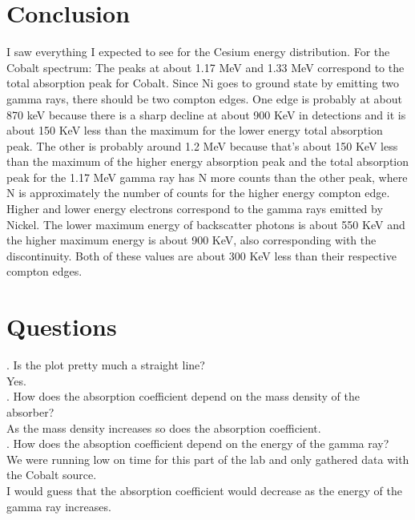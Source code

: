\documentclass[12pt]{article}
\begin{document}
\section{Conclusion}
\indent \indent I saw everything I expected to see for the Cesium energy distribution. For the Cobalt spectrum: The peaks at about 1.17 MeV and 1.33 MeV correspond to the total absorption peak for Cobalt. Since Ni goes to ground state by emitting two gamma rays, there should be two compton edges. One edge is probably at about 870 keV because there is a sharp decline at about 900 KeV in detections and it is about 150 KeV less than the maximum for the lower energy total absorption peak. The other is probably around 1.2 MeV because that's about 150 KeV less than the maximum of the higher energy absorption peak and the total absorption peak for the 1.17 MeV gamma ray has N more counts than the other peak, where N is approximately the number of counts for the higher energy compton edge. Higher and lower energy electrons correspond to the gamma rays emitted by Nickel. The lower maximum energy of backscatter photons is about 550 KeV and the higher maximum energy is about 900 KeV, also corresponding with the discontinuity. Both of these values are about 300 KeV less than their respective compton edges.

\section{Questions}
\indent {}. Is the plot pretty much a straight line? \\
\indent Yes. \\
. How does the absorption coefficient depend on the mass density of the absorber? \\
\indent As the mass density increases so does the absorption coefficient. \\
. How does the absoption coefficient depend on the energy of the gamma ray? \\
\indent We were running low on time for this part of the lab and only gathered data with the Cobalt source. \\
\indent I would guess that the absorption coefficient would decrease as the energy of the gamma ray
\indent increases.
\end{document}
